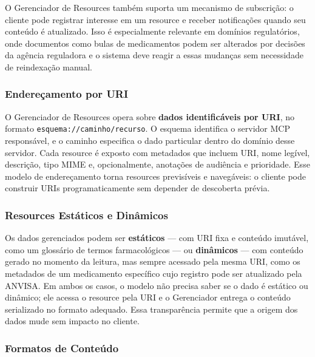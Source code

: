 \documentclass[12pt]{article}
\begin{document}
O Gerenciador de Resources também suporta um mecanismo de subscrição: o
cliente pode registrar interesse em um resource e receber notificações
quando seu conteúdo é atualizado. Isso é especialmente relevante em
domínios regulatórios, onde documentos como bulas de medicamentos podem
ser alterados por decisões da agência reguladora e o sistema deve reagir
a essas mudanças sem necessidade de reindexação manual.

\subsubsection{Endereçamento por URI}

O Gerenciador de Resources opera sobre \textbf{dados identificáveis por
URI}, no formato \texttt{esquema://caminho/recurso}. O esquema identifica
o servidor MCP responsável, e o caminho especifica o dado particular
dentro do domínio desse servidor. Cada resource é exposto com metadados
que incluem URI, nome legível, descrição, tipo MIME e, opcionalmente,
anotações de audiência e prioridade. Esse modelo de endereçamento torna
resources previsíveis e navegáveis: o cliente pode construir URIs
programaticamente sem depender de descoberta prévia.

\subsubsection{Resources Estáticos e Dinâmicos}

Os dados gerenciados podem ser \textbf{estáticos} --- com URI fixa e
conteúdo imutável, como um glossário de termos farmacológicos --- ou
\textbf{dinâmicos} --- com conteúdo gerado no momento da leitura, mas
sempre acessado pela mesma URI, como os metadados de um medicamento
específico cujo registro pode ser atualizado pela ANVISA. Em ambos os
casos, o modelo não precisa saber se o dado é estático ou dinâmico; ele
acessa o resource pela URI e o Gerenciador entrega o conteúdo serializado
no formato adequado. Essa transparência permite que a origem dos dados
mude sem impacto no cliente.

\subsubsection{Formatos de Conteúdo}
\end{document}
